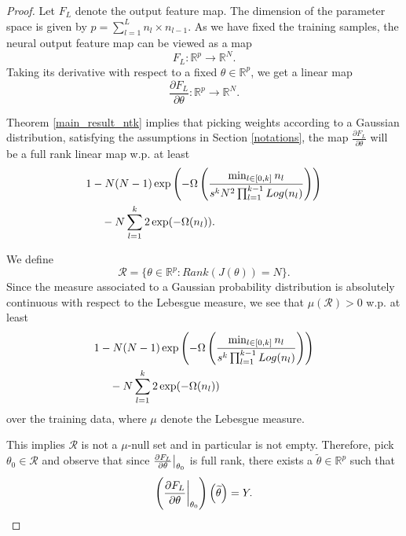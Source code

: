 \documentclass{article}
\theoremstyle{plain}
\theoremstyle{definition}
\theoremstyle{remark}
\newcommand\R{\mathbb{R}}
\begin{document}
\begin{proof}
Let $F_L$ denote the output feature map. The dimension of the parameter space is given by $p = \sum_{l=1}^Ln_l\times n_{l-1}$. As we have fixed the training samples, the neural output feature map can be viewed as a map
\begin{equation*}
F_L : \R^p \rightarrow \R^N.
\end{equation*}
Taking its derivative with respect to a fixed $\theta \in \R^p$, 
we get a linear map
\begin{equation*}
\frac{\partial{F_L}}{\partial{\theta}} : \R^p \rightarrow \R^N.
\end{equation*}

Theorem \ref{main_result_ntk} implies that picking weights according to a Gaussian distribution, satisfying the assumptions in Section \ref{notations}, the map
$\frac{\partial{F_L}}{\partial{\theta}}$ will be a full rank linear map 
w.p. at least
\begin{align*}
    & 1 - N(N-1)\exp\left(-
\Omega\left(
\frac{\min_{l \in [0,k]}n_l}{s^kN^2\prod_{l=1}^{k-1}Log(n_l)}
\right)
\right) \\
&\hspace{0.5cm}- N\sum_{l=1}^k2\exp(-\Omega(n_l)).
\end{align*}

We define 
\begin{equation}\label{rank_set}
\mathcal{R} = \{ \theta \in \R^p : Rank(J(\theta)) = N\}.
\end{equation}
Since the measure associated to a Gaussian probability distribution is absolutely continuous with respect to the Lebesgue measure, we see that 
$\mu(\mathcal{R}) > 0$ w.p. at least
\begin{align*}
    & 1 - N(N-1)\exp\left(-
\Omega\left(
\frac{\min_{l \in [0,k]}n_l}{s^k\prod_{l=1}^{k-1}Log(n_l)}
\right)
\right) \\
&\hspace{0.5cm}- N\sum_{l=1}^k2\exp(-\Omega(n_l))
\end{align*}
over the training data, where 
$\mu$ denote the Lebesgue measure.

This implies $\mathcal{R}$ is not a $\mu$-null set and in particular is not empty. Therefore, pick $\theta_0 \in \mathcal{R}$ and observe that since 
$\frac{\partial{F_L}}{\partial{\theta}}\big{\vert}_{\theta_0}$ is full rank, there exists a $\widetilde{\theta} \in \R^p$ such that
\begin{equation}\label{surj_jac}
	\left(
	\frac{\partial{F_L}}{\partial{\theta}}\bigg{\vert}_{\theta_0}
	\right)\left( \widetilde{\theta} \right) = Y.
\end{equation}


\end{proof}
\end{document}
